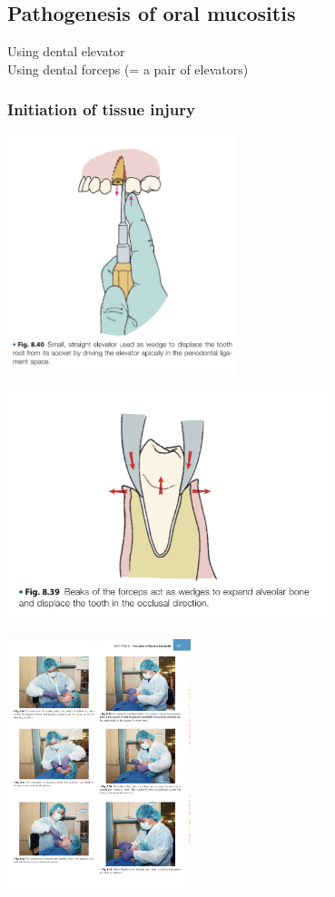 \documentclass[
paper=landscape,
paper=160mm:90mm, %
fontsize=11pt, %
pagesize, %
parskip=half-, %
]{scrartcl} %
\theoremstyle{mythmstyle} %
\begin{document}
\clearpage


\subsection{Pathogenesis of oral mucositis}
Using dental elevator \\

Using dental forceps (= a pair of elevators) \\

\subsubsection{Initiation of tissue injury}


\includegraphics[width=0.5\textwidth]{709_elevators.jpg}

\includegraphics[width=0.70\textwidth]{31717_forceps.jpg}

\includegraphics[width=0.40\textwidth]{89944_position_surgeon.jpg}
\end{document}

